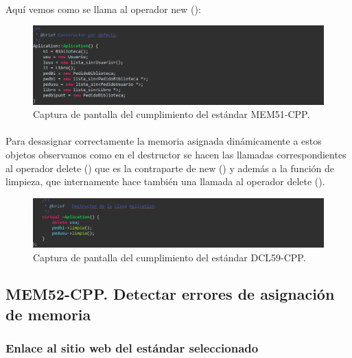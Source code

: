 			\paragraph{}Aquí vemos como se llama al operador new ():
			
			\begin{figure}[H]
				\centering
				\includegraphics[scale=0.8]{img/img3.png}
				\caption{Captura de pantalla del cumplimiento del estándar MEM51-CPP.}
				\label{img3}
			\end{figure}
			
			\paragraph{}Para desasignar correctamente la memoria asignada dinámicamente a estos objetos observamos como en el destructor se hacen las llamadas correspondientes al operador delete () que es la contraparte de new () y además a la función de limpieza, que internamente hace también una llamada al operador delete ().
			
			\begin{figure}[H]
				\centering
				\includegraphics[scale=0.8]{img/img4.png}
				\caption{Captura de pantalla del cumplimiento del estándar DCL59-CPP.}
				\label{img4}
			\end{figure}
		
	\subsection{MEM52-CPP. Detectar errores de asignación de memoria}
	
		\subsubsection{Enlace al sitio web del estándar seleccionado}
		

